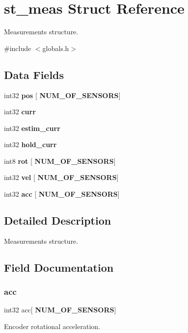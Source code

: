 \section{st\+\_\+meas Struct Reference}
\label{structst__meas}


Measurements structure.  




{\ttfamily \#include $<$globals.\+h$>$}

\subsection*{Data Fields}
\begin{DoxyCompactItemize}
\item 
int32 \textbf{ pos} [\textbf{ N\+U\+M\+\_\+\+O\+F\+\_\+\+S\+E\+N\+S\+O\+RS}]
\item 
int32 \textbf{ curr}
\item 
int32 \textbf{ estim\+\_\+curr}
\item 
int32 \textbf{ hold\+\_\+curr}
\item 
int8 \textbf{ rot} [\textbf{ N\+U\+M\+\_\+\+O\+F\+\_\+\+S\+E\+N\+S\+O\+RS}]
\item 
int32 \textbf{ vel} [\textbf{ N\+U\+M\+\_\+\+O\+F\+\_\+\+S\+E\+N\+S\+O\+RS}]
\item 
int32 \textbf{ acc} [\textbf{ N\+U\+M\+\_\+\+O\+F\+\_\+\+S\+E\+N\+S\+O\+RS}]
\end{DoxyCompactItemize}


\subsection{Detailed Description}
Measurements structure. 



\subsection{Field Documentation}
\mbox{\label{structst__meas_a382cdae8f034ef5627c27a46e2f00a72}} 
\subsubsection{acc}
{\footnotesize\ttfamily int32 acc[\textbf{ N\+U\+M\+\_\+\+O\+F\+\_\+\+S\+E\+N\+S\+O\+RS}]}

Encoder rotational acceleration. \mbox{\label{structst__meas_adfe6e2bdca09ed7177204234bc2a6d26}} 
